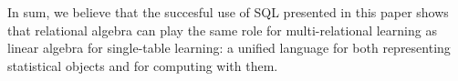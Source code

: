 \documentclass{acm_proc_article-sp}
\begin{document}
In sum, we believe that the succesful use of SQL presented in this paper shows that relational algebra can play the same role for multi-relational learning as linear algebra for single-table learning: a unified language for both representing statistical objects and for computing with them.

 



%





\end{document}

